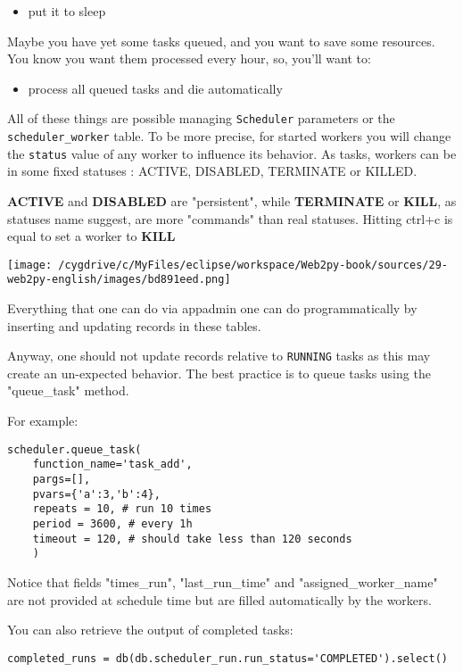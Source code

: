 \documentclass[justified,sixbynine,notoc]{tufte-book}
\def\ft{\small\tt}
\begin{document}
\begin{fullwidth}
\begin{itemize}
\item put it to sleep
\end{itemize}
Maybe you have yet some tasks queued, and you want to save some resources.
You know you want them processed every hour, so, you'll want to:
\begin{itemize}
\item process all queued tasks and die automatically
\end{itemize}
All of these things are possible managing {\ft Scheduler} parameters or the {\ft scheduler\_worker} table.
To be more precise, for started workers you will change the {\ft status} value of any worker to influence
its behavior.
As tasks, workers can be in some fixed statuses : ACTIVE, DISABLED, TERMINATE or KILLED.

{\bf ACTIVE} and {\bf DISABLED} are "persistent", while {\bf TERMINATE} or {\bf KILL}, as statuses
name suggest, are more "commands" than real statuses.
Hitting ctrl+c is equal to set a worker to {\bf KILL}


\goodbreak\begin{center}\texttt{[image: /cygdrive/c/MyFiles/eclipse/workspace/Web2py-book/sources/29-web2py-english/images/bd891eed.png]}\end{center}


Everything that one can do via appadmin one can do programmatically by inserting and updating records in these tables.

Anyway, one should not update records relative to {\ft RUNNING} tasks as this may create an un-expected behavior. The best practice is to queue tasks using the "queue\_task" method.

For example:

\begin{lstlisting}
scheduler.queue_task(
    function_name='task_add',
    pargs=[],
    pvars={'a':3,'b':4},
    repeats = 10, # run 10 times
    period = 3600, # every 1h
    timeout = 120, # should take less than 120 seconds
    )
\end{lstlisting}

Notice that fields "times\_run", "last\_run\_time" and "assigned\_worker\_name" are not provided at schedule time but are filled automatically by the workers.

You can also retrieve the output of completed tasks:

\begin{lstlisting}
completed_runs = db(db.scheduler_run.run_status='COMPLETED').select()
\end{lstlisting}


\end{fullwidth}
\end{document}
